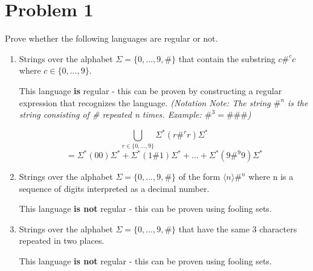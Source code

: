 \documentclass[11pt, letterpaper]{article}
\begin{document}
\section*{Problem 1}
Prove whether the following languages are regular or not.

\begin{enumerate}[label=\Alph*]

\item Strings over the alphabet $\Sigma = \{0,...,9,\#\}$ that contain the substring $c\#^cc$ where $c \in \{0,...,9\} $.

This language \textbf{is} regular - this can be proven by constructing a regular expression that recognizes the language. \textit{(Notation Note: The string $\#^n$ is the string consisting of \# repeated n times. Example: $\#^3 = \#\#\#$)}

$$ \bigcup_{r \in \{0,...,9\}} \Sigma^* (r \#^r r) \Sigma^* $$
$$= \Sigma^*(00)\Sigma^* + \Sigma^*(1\#1)\Sigma^* + ... + \Sigma^*(9\#^9 9)\Sigma^*$$


\item Strings over the alphabet $\Sigma = \{0,...,9,\#\}$ of the form $\langle n \rangle \#^n$ where n is a sequence of digits interpreted as a decimal number.

This language \textbf{is not} regular - this can be proven using fooling sets. 

\item Strings over the alphabet $\Sigma = \{0,...,9,\#\}$ that have the same 3 characters repeated in two places.

This language \textbf{is not} regular - this can be proven using fooling sets.

\end{enumerate}
\end{document}
